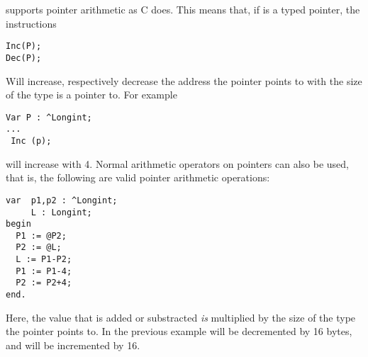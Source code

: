 \fpc supports pointer arithmetic as C does. This means that, if  is a
typed pointer, the instructions
\begin{verbatim}
Inc(P);
Dec(P);
\end{verbatim}
Will increase, respectively decrease the address the pointer points to
with the size of the type  is a pointer to. For example
\begin{verbatim}
Var P : ^Longint;
...
 Inc (p);
\end{verbatim}
will increase  with 4.
Normal arithmetic operators on pointers can also be used, that is, the
following are valid pointer arithmetic operations:
\begin{verbatim}
var  p1,p2 : ^Longint;
     L : Longint;
begin
  P1 := @P2;
  P2 := @L;
  L := P1-P2;
  P1 := P1-4;
  P2 := P2+4;
end.
\end{verbatim}
Here, the value that is added or substracted {\em is } multiplied by the
size of the type the pointer points to. In the previous
example  will be decremented by 16 bytes, and 
 will be incremented by 16.

